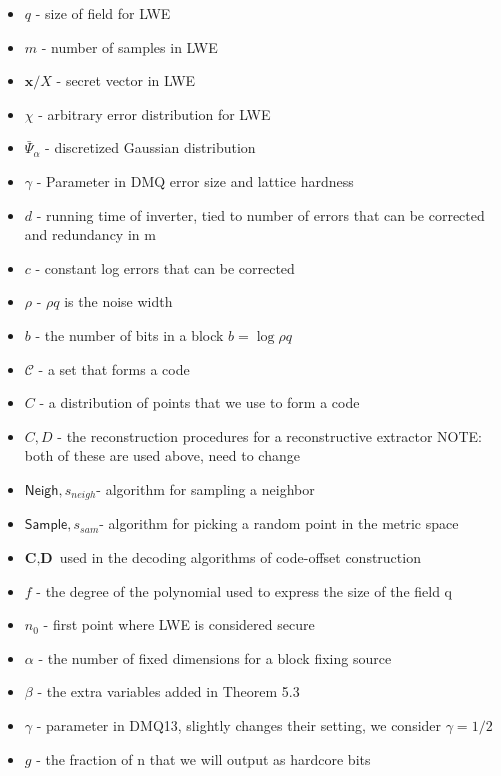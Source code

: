 \documentclass[11pt]{article}
\newcommand{\class}[1]{{\ensuremath{\mathsf{#1}}}}
\newcommand{\vect}[1]{\ensuremath{\textbf{#1}}}
\newcommand{\sample}{\ensuremath{\class{Sample}}\xspace}
\newcommand{\neigh}{\ensuremath{\class{Neigh}}\xspace}
\begin{document}
\begin{itemize}
\item $q$ - size of field for LWE
\item $m$ - number of samples in LWE
\item $\vect{x} / X$ - secret vector in LWE
\item $\chi$ - arbitrary error distribution for LWE
\item $\bar{\Psi}_\alpha$ - discretized Gaussian distribution
\item $\gamma$ - Parameter in DMQ error size and lattice hardness
\item $d$ - running time of inverter, tied to number of errors that can be corrected and redundancy in m
\item $c$ - constant log errors that can be corrected
\item $\rho$ - $\rho q$ is the noise width
\item $b$ - the number of bits in a block $b = \log \rho q$
\item $\mathcal{C}$ - a set that forms a code
\item $C$ - a distribution of points that we use to form a code
\item $C, D$ - the reconstruction procedures for a reconstructive extractor
   NOTE: both of these are used above, need to change
\item $\neigh , s_{neigh}$- algorithm for sampling a neighbor
\item $\sample, s_{sam} $- algorithm for picking a random point in the metric space
\item $\vect{C}, \vect{D} $ used in the decoding algorithms of code-offset construction
\item $f$ - the degree of the polynomial used to express the size of the field q
\item $n_0$ - first point where LWE is considered secure
\item $\alpha$ - the number of fixed dimensions for a block fixing source
\item $\beta$ - the extra variables added in Theorem 5.3
\item $\gamma$ - parameter in DMQ13, slightly changes their setting, we consider $\gamma = 1/2$
\item $g$ - the fraction of n that we will output as hardcore bits
\end{itemize}
\end{document}
